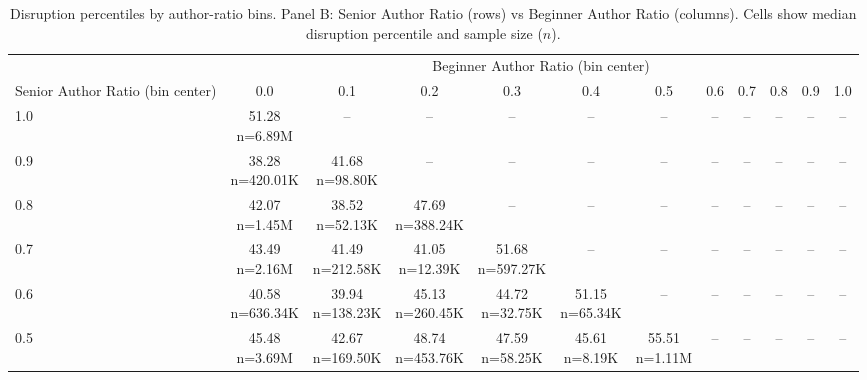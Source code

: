 \begin{table}\centering
            \caption{Disruption percentiles by author-ratio bins. Panel B: Senior Author Ratio (rows) vs Beginner Author Ratio (columns). Cells show median disruption percentile and sample size ($n$).}
            \scriptsize
            \setlength\tabcolsep{4pt}
            \renewcommand{\arraystretch}{1.1}
            \begin{tabular}{lccccccccccc}
            \toprule
            & \multicolumn{11}{c}{Beginner Author Ratio (bin center)} \\
            \cmidrule(lr){2-12}
            Senior Author Ratio (bin center) & 0.0 & 0.1 & 0.2 & 0.3 & 0.4 & 0.5 & 0.6 & 0.7 & 0.8 & 0.9 & 1.0 \\
            \midrule
            1.0 & \makecell{51.28 \\ \scriptsize n=6.89M} & -- & -- & -- & -- & -- & -- & -- & -- & -- & -- \\
0.9 & \makecell{38.28 \\ \scriptsize n=420.01K} & \makecell{41.68 \\ \scriptsize n=98.80K} & -- & -- & -- & -- & -- & -- & -- & -- & -- \\
0.8 & \makecell{42.07 \\ \scriptsize n=1.45M} & \makecell{38.52 \\ \scriptsize n=52.13K} & \makecell{47.69 \\ \scriptsize n=388.24K} & -- & -- & -- & -- & -- & -- & -- & -- \\
0.7 & \makecell{43.49 \\ \scriptsize n=2.16M} & \makecell{41.49 \\ \scriptsize n=212.58K} & \makecell{41.05 \\ \scriptsize n=12.39K} & \makecell{51.68 \\ \scriptsize n=597.27K} & -- & -- & -- & -- & -- & -- & -- \\
0.6 & \makecell{40.58 \\ \scriptsize n=636.34K} & \makecell{39.94 \\ \scriptsize n=138.23K} & \makecell{45.13 \\ \scriptsize n=260.45K} & \makecell{44.72 \\ \scriptsize n=32.75K} & \makecell{51.15 \\ \scriptsize n=65.34K} & -- & -- & -- & -- & -- & -- \\
0.5 & \makecell{45.48 \\ \scriptsize n=3.69M} & \makecell{42.67 \\ \scriptsize n=169.50K} & \makecell{48.74 \\ \scriptsize n=453.76K} & \makecell{47.59 \\ \scriptsize n=58.25K} & \makecell{45.61 \\ \scriptsize n=8.19K} & \makecell{55.51 \\ \scriptsize n=1.11M} & -- & -- & -- & -- & -- \\

\end{tabular}
\end{table}
